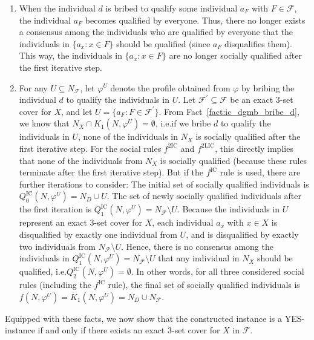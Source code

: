 \documentclass[
    12pt,               %
    a4paper,            %
    bibtotoc,           %
    pointlessnumbers,   %
    ngerman,            %
    titlepage,          %
    leqno,              %
    ]{scrarticle}       %
\newcommand\factref{Fact~\ref}
\begin{document}
\begin{Proof}
\begin{enumerate}[
    topsep=-4pt,
    leftmargin=*,
    itemindent=4.96em,
    label={\textit{Fact \ref*{thm:ic_dgmb_npc}.\arabic*}:},
    ref={\ref*{thm:ic_dgmb_npc}.\arabic*}
]
\item \label{fact:ic_dgmb_bribe_d}
When the individual $d$ is bribed to qualify some individual $a_F$ with $F \in \mathcal{F}$, the individual $a_F$ becomes qualified by everyone. Thus, there no longer exists a consensus among the individuals who are qualified by everyone that the individuals in $\{ a_x : x \in F \}$ should be qualified (since $a_F$ disqualifies them). This way, the individuals in $\{ a_x : x \in F \}$ are no longer socially qualified after the first iterative step.

\item \label{fact:ic_dgmb_exact_cover}
For any $U \subseteq N_\mathcal{F}$, let $\varphi^U$ denote the profile obtained from $\varphi$ by bribing the individual $d$ to qualify the individuals in $U$. Let $\mathcal{F}^\prime \subseteq \mathcal{F}$ be an exact 3-set cover for $X$, and let $U = \{ a_F : F \in \mathcal{F}^\prime \}$. From \factref{fact:ic_dgmb_bribe_d}, we know that $N_X \cap K_1(N, \varphi^U) = \emptyset$, i.e.\@ if we bribe $d$ to qualify the individuals in $U$, none of the individuals in $N_X$ is socially qualified after the first iterative step. For the social rules $f^{\text{2IC}}$ and $f^{\text{2LIC}}$, this directly implies that none of the individuals from $N_X$ is socially qualified (because these rules terminate after the first iterative step). But if the $f^{\text{IC}}$ rule is used, there are further iterations to consider: The initial set of socially qualified individuals is $Q^{\text{IC}}_0(N, \varphi^U) = N_D \cup U$. The set of newly socially qualified individuals after the first iteration is $Q^{\text{IC}}_1(N, \varphi^U) = N_\mathcal{F} \setminus U$. Because the individuals in $U$ represent an exact 3-set cover for $X$, each individual $a_x$ with $x \in X$ is disqualified by exactly one individual from $U$, and is disqualified by exactly two individuals from $N_\mathcal{F} \setminus U$. Hence, there is no consensus among the individuals in $Q^{\text{IC}}_1(N, \varphi^U) = N_\mathcal{F} \setminus U$ that any individual in $N_X$ should be qualified, i.e.\@ $Q^{\text{IC}}_2(N, \varphi^U) = \emptyset$. In other words, for all three considered social rules (including the $f^{\text{IC}}$ rule), the final set of socially qualified individuals is $f(N, \varphi^U) = K_1(N, \varphi^U) = N_D \cup N_\mathcal{F}$.
\end{enumerate}



Equipped with these facts, we now show that the constructed instance is a YES-instance if and only if there exists an exact 3-set cover for $X$ in $\mathcal{F}$.


\end{Proof}
\end{document}
